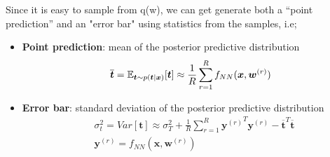 \documentclass[main]{subfiles}
\begin{document}
\noindent Since it is easy to sample from q(w), we can get generate both a “point prediction” and an "error bar" using statistics from the samples, i.e;
\begin{itemize}
    \item \textbf{Point prediction}: mean of the posterior predictive distribution
    \begin{equation}
        \overline{\bm{t}} = \operatorname{\mathbb{E}}_{\bm{t}\sim p(\bm{t}|\bm{x})}[\bm{t}] \approx \frac{1}{R} \sum_{r=1}^{R} f_{NN}(\bm{x}, \bm{w}^{(r)})
    \end{equation}
    \item \textbf{Error bar}: standard deviation of the posterior predictive distribution
    \begin{equation}
        \begin{split}
            &\sigma^2_t = Var[\bm{t}] \approx \sigma^2_T + \frac{1}{R} \sum_{r=1}^{R}{\bm{y}^{(r)}}^T  \bm{y}^{(r)} - {\overline{\bm{t}}}^T  \overline{\bm{t}}\\
            &\bm{y}^{(r)} = f_{NN} (\bm{x}, \bm{w}^{(r)})
        \end{split}
    \end{equation}
\end{itemize}
\end{document}
